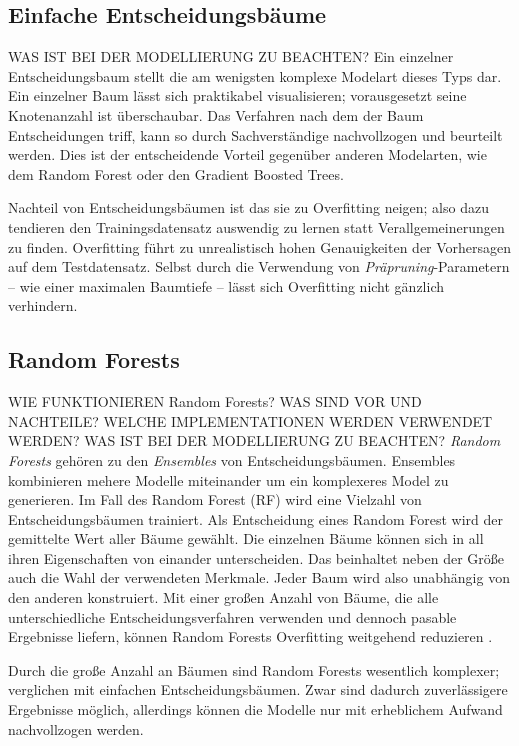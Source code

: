\subsection{Einfache Entscheidungsbäume}
\label{subsec:einfache_entscheidungsbaeume}
WAS IST BEI DER MODELLIERUNG ZU BEACHTEN?
Ein einzelner Entscheidungsbaum stellt die am wenigsten komplexe Modelart dieses Typs dar. Ein einzelner Baum lässt sich praktikabel visualisieren; vorausgesetzt seine Knotenanzahl ist überschaubar. Das Verfahren nach dem der Baum Entscheidungen triff, kann so durch Sachverständige nachvollzogen und beurteilt werden. Dies ist der entscheidende Vorteil gegenüber anderen Modelarten, wie dem Random Forest oder den Gradient Boosted Trees.

Nachteil von Entscheidungsbäumen ist das sie zu Overfitting neigen; also dazu tendieren den Trainingsdatensatz auswendig zu lernen statt Verallgemeinerungen zu finden. Overfitting führt zu unrealistisch hohen Genauigkeiten der Vorhersagen auf dem Testdatensatz. Selbst durch die Verwendung von \textit{Präpruning}-Parametern -- wie einer maximalen Baumtiefe -- lässt sich Overfitting nicht gänzlich verhindern. \cite{Muller.2017}

\subsection{Random Forests}
\label{subsec:random_forest}
WIE FUNKTIONIEREN Random Forests? WAS SIND VOR UND NACHTEILE? WELCHE IMPLEMENTATIONEN WERDEN VERWENDET WERDEN? WAS IST BEI DER MODELLIERUNG ZU BEACHTEN?
\textit{Random Forests} gehören zu den \textit{Ensembles} von Entscheidungsbäumen. Ensembles kombinieren mehere Modelle miteinander um ein komplexeres Model zu generieren. Im Fall des Random Forest (RF) wird eine Vielzahl von Entscheidungsbäumen trainiert. Als Entscheidung eines Random Forest wird der gemittelte Wert aller Bäume gewählt. Die einzelnen Bäume können sich in all ihren Eigenschaften von einander unterscheiden. Das beinhaltet neben der Größe auch die Wahl der verwendeten Merkmale. Jeder Baum wird also unabhängig von den anderen konstruiert. Mit einer großen Anzahl von Bäume, die alle unterschiedliche Entscheidungsverfahren verwenden und dennoch pasable Ergebnisse liefern, können Random Forests Overfitting weitgehend reduzieren \cite{Muller.2017}. 

Durch die große Anzahl an Bäumen sind Random Forests wesentlich komplexer; verglichen mit einfachen Entscheidungsbäumen. Zwar sind dadurch zuverlässigere Ergebnisse möglich, allerdings können die Modelle nur mit erheblichem Aufwand nachvollzogen werden.

